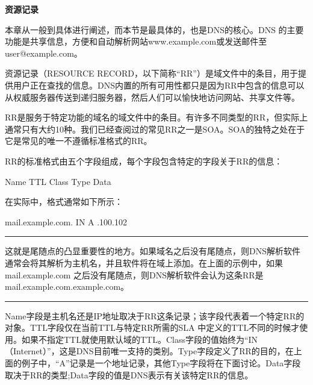 ﻿\documentclass[english,runningheads,a4paper]{llncs}[2018/03/10]
\begin{document}
\par\noindent\textbf{资源记录}

\par\noindent 本章从一般到具体进行阐述，而本节是最具体的，也是DNS的核心。DNS 的主要功能是共享信息，方便和自动解析网站www.example.com或发送邮件至user@example.com。

\par\setlength\parindent{2em}资源记录（RESOURCE RECORD，以下简称“RR”）是域文件中的条目，用于提供用户正在查找的信息。DNS内置的所有可用性都只是因为RR中包含的信息可以从权威服务器传送到递归服务器，然后人们可以愉快地访问网站、共享文件等。

\par\setlength\parindent{2em}RR是服务于特定功能的域名的域文件中的条目。有许多不同类型的RR，但实际上通常只有大约10种。我们已经查阅过的常见RR之一是SOA。SOA的独特之处在于它是常见的唯一不遵循标准格式的RR。

\par\setlength\parindent{2em}RR的标准格式由五个字段组成，每个字段包含特定的字段关于RR的信息：

\par\setlength\parindent{2em}Name \qquad TTL \qquad Class \qquad Type \qquad Data

\par\setlength\parindent{2em} 在实际中，格式通常如下所示：

\par\setlength\parindent{2em} mail.example.com.  \qquad IN \qquad A .100.102

\vbox{}

\par\noindent\rule[0.25\baselineskip]{\textwidth}{1pt} %

\begin{adjustwidth}{2em}{2em}
\qquad 这就是尾随点的凸显重要性的地方。如果域名之后没有尾随点，则DNS解析软件通常会将其解析为主机名，并且软件将在域上添加。在上面的示例中，如果mail.example.com 之后没有尾随点，则DNS解析软件会认为这条RR是mail.example.com.example.com。
\end{adjustwidth}

\par\noindent\rule[0.25\baselineskip]{\textwidth}{1pt} %

\par\setlength\parindent{2em} Name字段是主机名还是IP地址取决于RR这条记录；该字段代表着一个特定RR的对象。TTL字段仅在当前TTL与特定RR所需的SLA 中定义的TTL不同的时候才使用。如果不指定TTL就使用默认域的TTL。Class字段的值始终为“IN（Internet）”，这是DNS目前唯一支持的类别。Type字段定义了RR的目的，在上面的例子中，“A”记录是一个地址记录，其他Type字段将在下面讨论。Data字段取决于RR的类型;Data字段的值是DNS表示有关该特定RR的信息。
\end{document}
